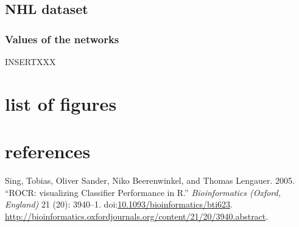 \documentclass[]{article}
\begin{document}
\subsection{NHL dataset}\label{nhl-dataset}

\subsubsection{Values of the networks}\label{values-of-the-networks}

INSERTXXX

\newpage

\section{list of figures}\label{list-of-figures}

\listoffigures
\newpage

\section{references}\label{references}

\twocolumn

Sing, Tobias, Oliver Sander, Niko Beerenwinkel, and Thomas Lengauer.
2005. ``ROCR: visualizing Classifier Performance in R.''
\emph{Bioinformatics (Oxford, England)} 21 (20): 3940--1.
doi:\href{http://dx.doi.org/10.1093/bioinformatics/bti623}{10.1093/bioinformatics/bti623}.
\url{http://bioinformatics.oxfordjournals.org/content/21/20/3940.abstract}.
\end{document}
